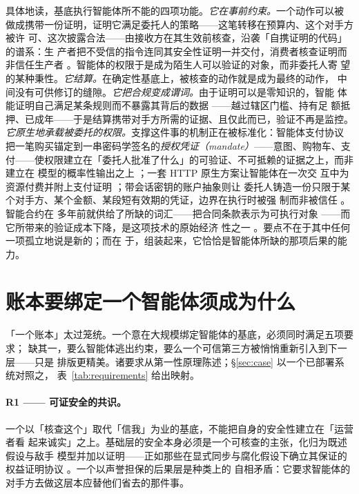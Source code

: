 \documentclass[11pt,UTF8]{ctexart}
\newcommand{\R}[1]{R#1}
\begin{document}
具体地读，基底执行智能体所不能的四项功能。\emph{它在事前约束。}一个动作可以被
做成携带一份证明，证明它满足委托人的策略——这笔转移在预算内、这个对手方被许
可、这次披露合法——由接收方在其生效前核查，沿袭「自携证明的代码」的谱系：生
产者把不受信的指令连同其安全性证明一并交付，消费者核查证明而非信任生产者
\citep{necula1997pcc}。智能体的权限于是成为陌生人可以验证的对象，而非委托人寄
望的某种秉性。\emph{它结算。}在确定性基底上，被核查的动作就是成为最终的动作，
中间没有可供修订的缝隙。\emph{它把合规变成谓词。}由于证明可以是零知识的，智能
体能证明自己满足某条规则而不暴露其背后的数据
\citep{goldwasser1989knowledge,bensasson2014zerocash}——越过辖区门槛、持有足
额抵押、已成年——于是结算携带对手方所需的证据、且仅此而已，验证不再是监控。
\emph{它原生地承载被委托的权限。}支撑这件事的机制正在被标准化：智能体支付协议
把一笔购买锚定到一串密码学签名的\emph{授权凭证（mandate）}——意图、购物车、支
付——使权限建立在「委托人批准了什么」的可验证、不可抵赖的证据之上，而非建立在
模型的概率性输出之上 \citep{ap2google2025}；一套 HTTP 原生方案让智能体在一次交
互中为资源付费并附上支付证明 \citep{x402coinbase2025}；带会话密钥的账户抽象则让
委托人铸造一份只限于某个对手方、某个金额、某段短有效期的凭证，边界在执行时被强
制而非被信任 \citep{erc4337}。智能合约在
多年前就供给了所缺的词汇——把合同条款表示为可执行对象
\citep{szabo1997formalizing}——而它所带来的验证成本下降，是这项技术的原始经济
性之一 \citep{catalini2020simple}。要点不在于其中任何一项孤立地说是新的；而在
于，组装起来，它恰恰是智能体所缺的那项后果的能力。

\section{账本要绑定一个智能体须成为什么}
\label{sec:requirements}

「一个账本」太过笼统。一个意在大规模绑定智能体的基底，必须同时满足五项要求；
缺其一，要么智能体逃出约束，要么一个可信第三方被悄悄重新引入到下一层——只是
排版更精美。诸要求从第一性原理陈述；\S\ref{sec:case} 以一个已部署系统对照之，
表~\ref{tab:requirements} 给出映射。

\paragraph{\R{1} —— 可证安全的共识。}
一个以「核查这个」取代「信我」为业的基底，不能把自身的安全性建立在「运营者看
起来诚实」之上。基础层的安全本身必须是一个可核查的主张，化归为既述假设与敌手
模型并加以证明——正如那些在显式同步与腐化假设下确立其保证的权益证明协议
\citep{kiayias2017ouroboros,david2018praos}。一个以声誉担保的后果层是种类上的
自相矛盾：它要求智能体的对手方去做这层本应替他们省去的那件事。
\end{document}

